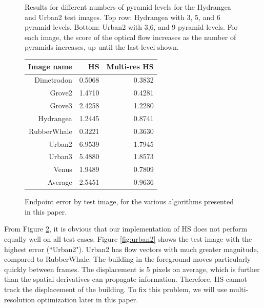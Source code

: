 \documentclass[10pt,twocolumn,letterpaper]{article}
\begin{document}
\begin{figure}
\begin{subfigure}[b]{0.3\textwidth}
       \end{subfigure}
	\caption{Results for different numbers of pyramid levels for the Hydrangea and Urban2 test images.  Top row: Hydrangea with 3, 5, and 6 pyramid levels.  Bottom: Urban2 with 3,6, and 9 pyramid levels. For each image, the score of the optical flow increases as the number of pyramids increases, up until the last level shown. }
	\label{fig:multires}
\end{figure}

\begin{figure}
\begin{tabular} {|r | r | r|}
\hline
Image name & HS & Multi-res HS \\
\hline 
Dimetrodon & 0.5068 &  0.3832 \\
Grove2 & 1.4710 & 0.4281 \\
Grove3 &  2.4258 & 1.2280 \\
Hydrangea & 1.2445 & 0.8741 \\
RubberWhale & 0.3221 & 0.3630 \\
Urban2 & 6.9539 & 1.7945 \\
Urban3 & 5.4880 & 1.8573 \\
Venus & 1.9489 & 0.7809 \\
\hline
Average & 2.5451 & 0.9636 \\
\hline

\end{tabular}

\caption{Endpoint error by test image, for the various algorithms presented in this paper.}
\label{fig:table}
\end{figure}

From Figure \ref{fig:table}, it is obvious that our implementation of HS does not perform equally well on all test cases.  Figure \ref{fig:urban2} shows the test image with the highest error (``Urban2").  Urban2 has flow vectors with much greater magnitude, compared to RubberWhale.  The building in the foreground moves particularly quickly between frames.  The displacement is 5 pixels on average, which is further than the spatial derivatives can propagate information.  Therefore, HS cannot track the displacement of the building.  To fix this problem, we will use multi-resolution optimization later in this paper.
\end{document}
